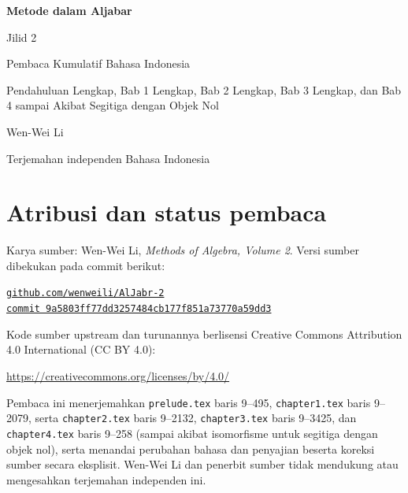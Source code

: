\documentclass[
  colors=true,
  fontsetup=font-setup-id.tex,
  titlesetup=titles-setup.tex
]{AJbook2}
\theoremstyle{plain}
\theoremstyle{nonumberplain}
\numberwithin{equation}{section}
\numberwithin{figure}{section}
\begin{document}
\begin{titlepage}
  \centering
  \vspace*{0.16\textheight}
  {\Huge\bfseries Metode dalam Aljabar\par}
  \vspace{0.8em}
  {\LARGE Jilid 2\par}
  \vspace{1.8em}
  {\Large Pembaca Kumulatif Bahasa Indonesia\par}
  \vspace{0.6em}
  {\large Pendahuluan Lengkap, Bab 1 Lengkap, Bab 2 Lengkap, Bab 3 Lengkap, dan Bab 4 sampai Akibat Segitiga dengan Objek Nol\par}
  \vfill
  {\Large Wen-Wei Li\par}
  \vspace{0.6em}
  {\normalsize Terjemahan independen Bahasa Indonesia\par}
  \vspace*{0.10\textheight}
\end{titlepage}

\cleardoublepage
\thispagestyle{empty}
\section*{Atribusi dan status pembaca}
Karya sumber: Wen-Wei Li, \emph{Methods of Algebra, Volume 2}. Versi
sumber dibekukan pada commit berikut:
\begin{center}
  \small
  \href{https://github.com/wenweili/AlJabr-2}{\texttt{github.com/wenweili/AlJabr-2}}\\
  \href{https://github.com/wenweili/AlJabr-2/commit/9a5803ff77dd3257484cb177f851a73770a59dd3}{\texttt{commit 9a5803ff77dd3257484cb177f851a73770a59dd3}}
\end{center}
Kode sumber upstream dan turunannya berlisensi Creative Commons
Attribution 4.0 International (CC BY 4.0):
\begin{center}
  \small\url{https://creativecommons.org/licenses/by/4.0/}
\end{center}
Pembaca ini menerjemahkan
\texttt{prelude.tex} baris 9--495, \texttt{chapter1.tex} baris 9--2079,
serta \texttt{chapter2.tex} baris 9--2132, \texttt{chapter3.tex} baris
9--3425, dan \texttt{chapter4.tex} baris 9--258 (sampai akibat isomorfisme
untuk segitiga dengan objek nol), serta menandai
perubahan bahasa dan penyajian beserta koreksi sumber secara eksplisit.
Wen-Wei Li dan penerbit sumber tidak mendukung atau mengesahkan terjemahan
independen ini.
\end{document}
